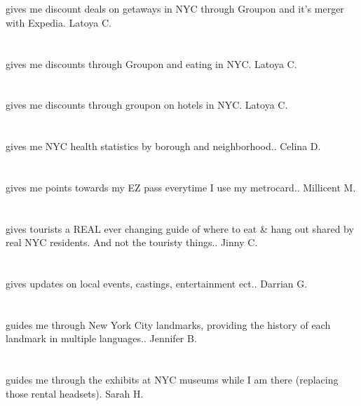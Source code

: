 \section{}gives me discount deals on getaways  in NYC through Groupon and it's merger with Expedia. Latoya C.
\section{}gives me discounts through Groupon and  eating in NYC. Latoya C.
\section{}gives me discounts through groupon on hotels in NYC. Latoya C.
\section{}gives me NYC health statistics by borough and neighborhood.. Celina D.
\section{}  gives me points towards my EZ pass everytime I use my metrocard.. Millicent M.
\section{}gives tourists a REAL ever changing guide of where to eat \& hang out shared by real NYC residents. And not the touristy things.. Jinny C.
\section{}gives updates on local events,  castings,  entertainment ect.. Darrian G.
\section{}guides me through New York City landmarks,  providing the history of each landmark in multiple languages.. Jennifer B.
\section{}guides me through the exhibits at NYC museums while I am there (replacing those rental headsets). Sarah H.
